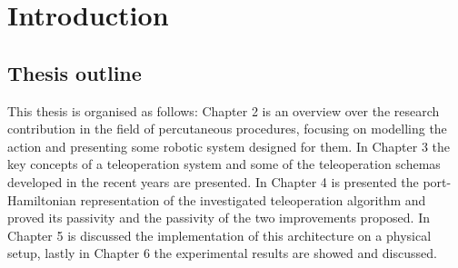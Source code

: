 \chapter{Introduction} %



\section{Thesis outline}
This thesis is organised as follows: Chapter 2 is an overview over the research contribution in the field of percutaneous procedures, focusing on modelling the action and presenting some robotic system designed for them. In Chapter 3 the key concepts of a teleoperation system and some of the teleoperation schemas developed in the recent years are presented. In Chapter 4  is presented the port-Hamiltonian representation of the investigated teleoperation algorithm  and proved its passivity and the passivity of the two improvements proposed. In Chapter 5 is discussed the implementation of this architecture on a physical setup, lastly in Chapter 6 the experimental results are showed and discussed.

\thispagestyle{empty}
